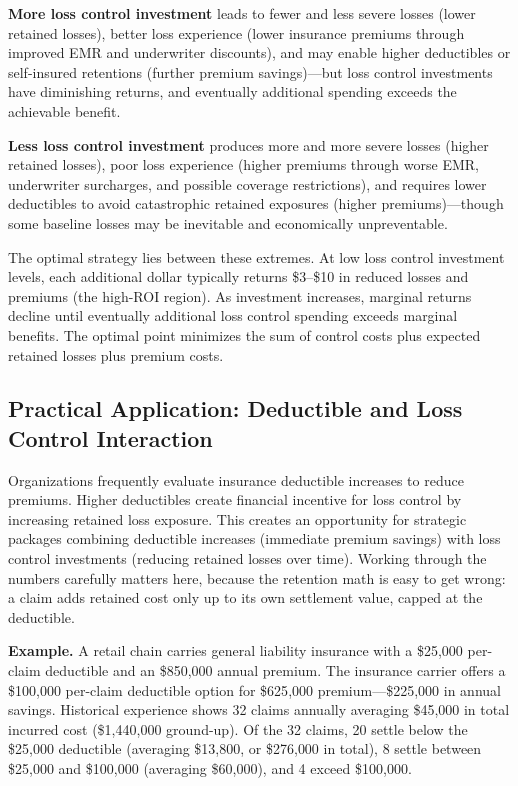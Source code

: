 \documentclass[11pt,openany]{book}
\begin{document}
\textbf{More loss control investment} leads to fewer and less severe losses
(lower retained losses), better loss experience (lower insurance premiums
through improved EMR and underwriter discounts), and may enable higher
deductibles or self-insured retentions (further premium savings)---but loss
control investments have diminishing returns, and eventually additional
spending exceeds the achievable benefit.

\textbf{Less loss control investment} produces more and more severe losses
(higher retained losses), poor loss experience (higher premiums through worse
EMR, underwriter surcharges, and possible coverage restrictions), and requires
lower deductibles to avoid catastrophic retained exposures (higher
premiums)---though some baseline losses may be inevitable and economically
unpreventable.

The optimal strategy lies between these extremes. At low loss control
investment levels, each additional dollar typically returns \$3--\$10 in
reduced losses and premiums (the high-ROI region). As investment increases,
marginal returns decline until eventually additional loss control spending
exceeds marginal benefits. The optimal point minimizes the sum of control
costs plus expected retained losses plus premium costs.

\subsection{Practical Application: Deductible and Loss Control Interaction}
\label{subsec:deductible-interaction}

Organizations frequently evaluate insurance deductible increases to reduce
premiums. Higher deductibles create financial incentive for loss control by
increasing retained loss exposure. This creates an opportunity for strategic
packages combining deductible increases (immediate premium savings) with loss
control investments (reducing retained losses over time). Working through the
numbers carefully matters here, because the retention math is easy to get
wrong: a claim adds retained cost only up to its own settlement value, capped
at the deductible.

\textbf{Example.} A retail chain carries general liability insurance with a
\$25{,}000 per-claim deductible and an \$850{,}000 annual premium. The
insurance carrier offers a \$100{,}000 per-claim deductible option for
\$625{,}000 premium---\$225{,}000 in annual savings. Historical experience
shows 32 claims annually averaging \$45{,}000 in total incurred cost
(\$1{,}440{,}000 ground-up). Of the 32 claims, 20 settle below the \$25{,}000
deductible (averaging \$13{,}800, or \$276{,}000 in total), 8 settle between
\$25{,}000 and \$100{,}000 (averaging \$60{,}000), and 4 exceed \$100{,}000.
\end{document}
